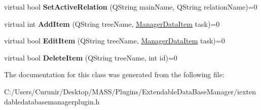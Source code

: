 \begin{DoxyCompactItemize}
\mbox{\label{class_i_extendable_data_base_manager_plugin_a20b67985093680372a1c14aa29481e42}} 
virtual bool {\bfseries Set\+Active\+Relation} (Q\+String main\+Name, Q\+String relation\+Name)=0
\item 
\mbox{\label{class_i_extendable_data_base_manager_plugin_a0b44f850dabdb3d4cd985c1000f0d6d9}} 
virtual int {\bfseries Add\+Item} (Q\+String tree\+Name, \hyperlink{class_i_extendable_data_base_manager_plugin_1_1_manager_data_item}{Manager\+Data\+Item} task)=0
\item 
\mbox{\label{class_i_extendable_data_base_manager_plugin_a45c9c133b47f3babe95ccfe53489f193}} 
virtual bool {\bfseries Edit\+Item} (Q\+String tree\+Name, \hyperlink{class_i_extendable_data_base_manager_plugin_1_1_manager_data_item}{Manager\+Data\+Item} task)=0
\item 
\mbox{\label{class_i_extendable_data_base_manager_plugin_aaa311e2c898b0e974e27ee0efae1716e}} 
virtual bool {\bfseries Delete\+Item} (Q\+String tree\+Name, int id)=0
\end{DoxyCompactItemize}


The documentation for this class was generated from the following file\+:\begin{DoxyCompactItemize}
\item 
C\+:/\+Users/\+Curunir/\+Desktop/\+M\+A\+S\+S/\+Plugins/\+Extendable\+Data\+Base\+Manager/iextendabledatabasemanagerplugin.\+h\end{DoxyCompactItemize}
